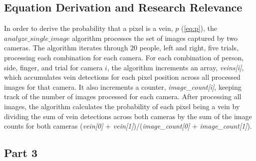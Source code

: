 \subsection{Equation Derivation and Research Relevance}
In order to derive the probability that a pixel is a vein, \(p\) (\ref{eq:p}), the \(\textit{analyze_single_image}\) algorithm processes the set of images captured by two cameras. The algorithm iterates through \(20\) people, left and right, five trials, processing each combination for each camera. For each combination of person, side, finger, and trial for camera \(i\), the algorithm increments an array, \textit{veins[i]}, which accumulates vein detections for each pixel position across all processed images for that camera. It also increments a counter, \textit{image_count[i]}, keeping track of the number of images processed for each camera. 
After processing all images, the algorithm calculates the probability of each pixel being a vein by dividing the sum of vein detections across both cameras by the sum of the image counts for both cameras (\textit{vein[0]} + \textit{vein[1]})/(\textit{image_count[0]} + \textit{image_count[1]}).


\subsection{Part 3}